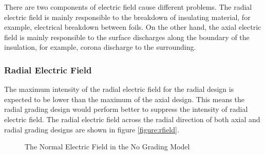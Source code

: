 There are two components of electric field cause different problems. The radial electric field is mainly responsible to the breakdown of insulating material, for example, electrical breakdown between foils. On the other hand, the axial electric field is mainly responsible to the surface discharges along the boundary of the insulation, for example, corona discharge to the surrounding.

\subsubsection{Radial Electric Field}
The maximum intensity of the radial electric field for the radial design is expected to be lower than the maximum of the axial design. This means the radial grading design would perform better to suppress the intensity of radial electric field. The radial electric field across the radial direction of both axial and radial grading designs are shown in figure \ref{figure:rfield}.

\begin{figure}[!h]
  \centering
{} 
\caption{The Normal Electric Field in the No Grading Model}
\label{Figure:No_Grad_Failing}
\end{figure}


